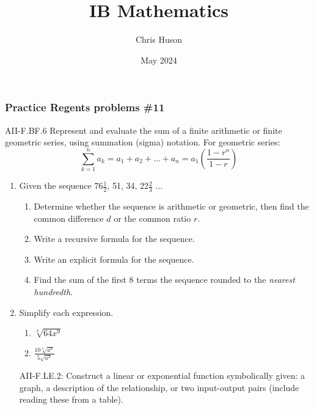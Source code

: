\documentclass[12pt, twoside]{article}
\title{IB Mathematics}
\author{Chris Huson}
\date{May 2024}
\begin{document}
\subsubsection*{Practice Regents problems \#11}
AII-F.BF.6 Represent and evaluate the sum of a finite arithmetic
or finite geometric series, using summation (sigma) notation. For geometric series:
$$\sum_{k=1}^{n} a_k = a_1 + a_2 + \ldots + a_n = a_1 \left( \frac{1-r^n}{1-r} \right)$$

\begin{enumerate}
\item Given the sequence $76 \frac{1}{2}$, 51, 34, $22 \frac{2}{3}$ $\ldots$
\begin{enumerate}[itemsep=2cm]
    \item Determine whether the sequence is arithmetic or geometric, then find the common difference $d$ or the common ratio $r$.
    \item Write a recursive formula for the sequence.
    \item Write an explicit formula for the sequence.
    \item Find the sum of the first 8 terms the sequence rounded to the \emph{nearest hundredth}.
\end{enumerate} \vspace{3cm}

\item Simplify each expression. 
\begin{multicols}{2}
    \begin{enumerate}
        \item $\sqrt[3]{64x^9}$
        \item $\displaystyle \frac{10\sqrt[4]{a^{6}}}{5\sqrt{a^{2}}}$
    \end{enumerate}
\end{multicols}
\vspace{3cm}

\newpage
AII-F.LE.2: Construct a linear or exponential function symbolically given: a graph, a description of the relationship, or two input-output pairs (include reading these from a table).


\end{enumerate}
\end{document}
